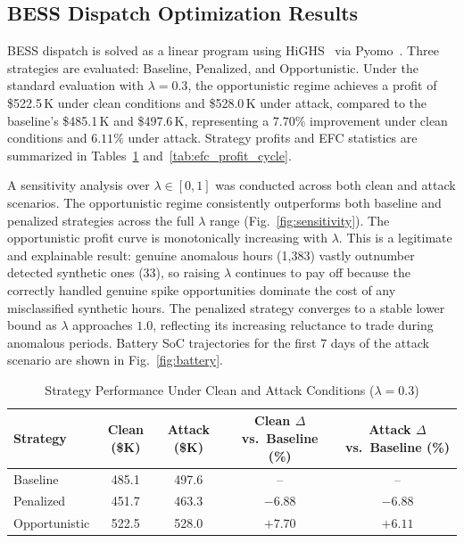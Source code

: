 \documentclass[journal]{IEEEtran}
\begin{document}
\subsection{BESS Dispatch Optimization Results}
BESS dispatch is solved as a linear program using HiGHS~\cite{HiGHS} via Pyomo~\cite{Pyomo}. Three strategies are evaluated: Baseline, Penalized, and Opportunistic. Under the standard evaluation with $\lambda = 0.3$, the opportunistic regime achieves a profit of \$522.5\,K under clean conditions and \$528.0\,K under attack, compared to the baseline's \$485.1\,K and \$497.6\,K, representing a $7.70\%$ improvement under clean conditions and $6.11\%$ under attack. Strategy profits and EFC statistics are summarized in Tables~\ref{tab:strategy_results} and~\ref{tab:efc_profit_cycle}.

A sensitivity analysis over $\lambda \in [0, 1]$ was conducted across both clean and attack scenarios. The opportunistic regime consistently outperforms both baseline and penalized strategies across the full $\lambda$ range (Fig.~\ref{fig:sensitivity}). The opportunistic profit curve is monotonically increasing with $\lambda$. This is a legitimate and explainable result: genuine anomalous hours (1,383) vastly outnumber detected synthetic ones (33), so raising $\lambda$ continues to pay off because the correctly handled genuine spike opportunities dominate the cost of any misclassified synthetic hours. The penalized strategy converges to a stable lower bound as $\lambda$ approaches $1.0$, reflecting its increasing reluctance to trade during anomalous periods. Battery SoC trajectories for the first 7 days of the attack scenario are shown in Fig.~\ref{fig:battery}.

\begin{table}[!t]
\centering
\caption{Strategy Performance Under Clean and Attack Conditions ($\lambda = 0.3$)}
\label{tab:strategy_results}
\begin{tabular}{lcccc}
\hline
\textbf{Strategy} & \textbf{Clean (\$K)} & \textbf{Attack (\$K)} & \textbf{Clean $\Delta$ vs.\ Baseline (\%)} & \textbf{Attack $\Delta$ vs.\ Baseline (\%)} \\
\hline
Baseline      & 485.1 & 497.6 & -- & -- \\
Penalized     & 451.7 & 463.3 & $-6.88$ & $-6.88$ \\
Opportunistic & 522.5 & 528.0 & $+7.70$ & $+6.11$ \\
\hline
\end{tabular}
\end{table}
\end{document}
